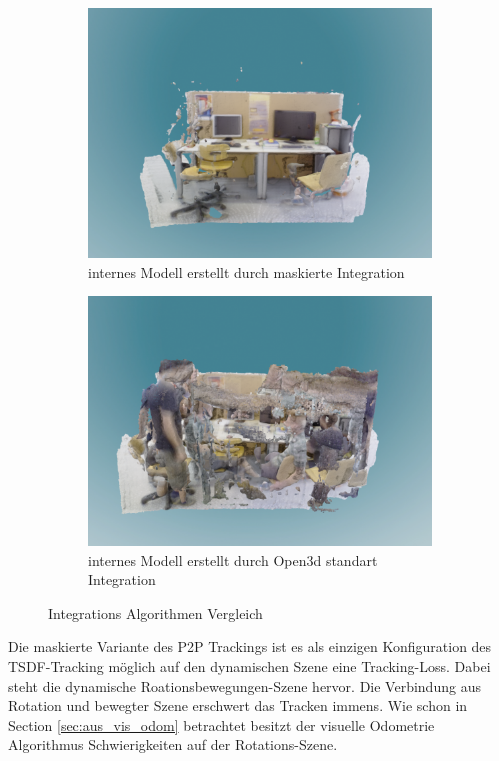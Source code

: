 \documentclass[12pt,DIV=15,BCOR=15mm,twoside,headsepline,abstract=true,listof=totoc,bibliography=totoc]{scrreprt}
\theoremstyle{remark}    %
\begin{document}
\begin{figure}[ht]
        \begin{subfigure}[t]{0.45\textwidth}
            \centering
            \includegraphics[width=\textwidth]{pics/maskout.png}
            \caption{internes Modell erstellt durch maskierte Integration}
            \label{fig:recon_mask}
        \end{subfigure}
        \hfill
        \begin{subfigure}[t]{0.45\textwidth}
            \centering
            \includegraphics[width=\textwidth]{pics/raw.png}
            \caption{internes Modell erstellt durch Open3d standart Integration}
            \label{fig:recon_raw}
        \end{subfigure}
        \caption{Integrations Algorithmen Vergleich}
        \label{fig:bilder_nebeneinander}
    \end{figure}
    Die maskierte Variante des \ac{P2P} Trackings ist es als einzigen Konfiguration des \ac{TSDF}-Tracking möglich auf den dynamischen Szene eine Tracking-Loss. 
    Dabei steht die dynamische Roationsbewegungen-Szene hervor. Die Verbindung aus Rotation und bewegter Szene erschwert das Tracken immens.
    Wie schon in Section \ref{sec:aus_vis_odom} betrachtet besitzt der visuelle Odometrie Algorithmus Schwierigkeiten auf der Rotations-Szene.
\end{document}
